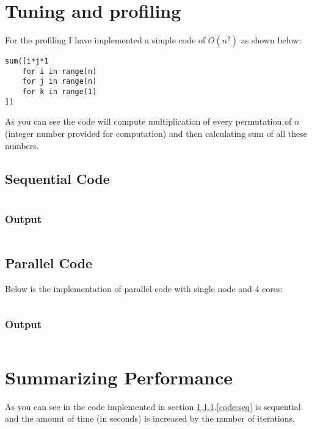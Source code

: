 \section{Tuning and profiling}\label{section:proifiling}
For the profiling I have implemented a simple code of $ O(n^2) $ as shown below:
\begin{verbatim}
sum([i*j*1 
    for i in range(n) 
    for j in range(n) 
    for k in range(1)
])
\end{verbatim}
As you can see the code will compute multiplication of every permutation of $ n $ (integer number provided for computation) and then calculating sum of all these numbers.

\subsection{Sequential Code}\label{subsec:sequential}
\inputminted{python}{../src/experiment.py}\label{code:seq}

\subsubsection{Output}
\inputminted{text}{../src/outputNonRay.txt}


\subsection{Parallel Code}\label{subsec:parallel}
Below is the implementation of parallel code with single node and 4 cores: 
\inputminted{python}{../src/experimentRay.py}\label{code:parallel}

\subsubsection{Output}
\inputminted{text}{../src/outputRay.txt}


\section{Summarizing Performance}
As you can see in the code implemented in section \ref{section:proifiling}.\ref{subsec:sequential}.\ref{code:seq} is sequential and the amount of time (in seconds) is increased by the number of iterations.


